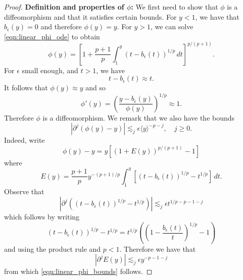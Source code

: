 \documentclass[11pt]{amsart}
\theoremstyle{definition}
\theoremstyle{remark}
\numberwithin{equation}{section}
\newcommand{\ang}[1]{\langle #1 \rangle}
\begin{document}
\begin{proof}
    \textbf{Definition and properties of $\phi$:} We first need to show that $\phi$ is a diffeomorphism and that it satisfies certain bounds. For $y < 1$, we have that $b_\epsilon(y) = 0$ and therefore $\phi(y) = y$. For $y > 1$, we can solve \eqref{eqn:linear_phi_ode} to obtain 
    \[\phi(y) = \left[1 + \frac{p+1}{p} \int_{1}^{y}(t - b_\epsilon(t))^{1/p}\,dt\right]^{p / (p + 1)}.\]
    For $\epsilon$ small enough, and $t > 1$, we have 
    \[t - b_\epsilon(t) \approx t.\]
    It follows that $\phi(y) \approx y$ and so 
    \[\phi'(y) = \left(\frac{y - b_\epsilon(y)}{\phi(y)}\right)^{1/p} \approx 1.\]
    Therefore $\phi$ is a diffeomorphism. We remark that we also have the bounds
    \begin{equation}\label{eqn:linear_phi_bounds}
        |\partial^j(\phi(y) - y)| \lesssim_j \epsilon\ang{y}^{-p-j}, \quad j \geq 0.
    \end{equation}
    Indeed, write 
    \[\phi(y) - y = y[(1 + E(y))^{p/(p+1)} - 1]\] 
    where
    \[E(y) = \frac{p+1}{p}y^{-(p+1)/p}\int_{1}^{y}[(t - b_\epsilon(t))^{1/p} - t^{1/p}]\,dt.\]
    Observe that
    \[|\partial^j((t - b_\epsilon(t))^{1/p} - t^{1/p})| \lesssim_j \epsilon t^{1/p - p - 1 - j}\]
    which follows by writing
    \[(t - b_\epsilon(t))^{1/p} - t^{1/p} = t^{1/p}\left(\left(1 - \frac{b_\epsilon(t)}{t}\right)^{1/p} - 1\right)\]
    and using the product rule and $p < 1$. Therefore we have that
    \[|\partial^j E(y)| \lesssim_j \epsilon y^{-p - 1 - j}\]
    from which \eqref{eqn:linear_phi_bounds} follows. \par


\end{proof}
\end{document}
